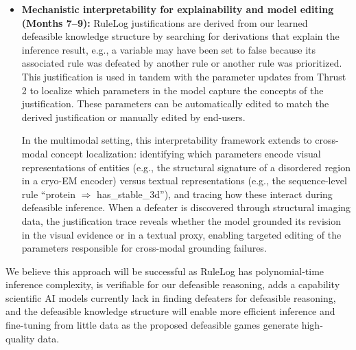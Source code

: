 \documentclass[11pt]{article}
\begin{document}
\begin{itemize}[leftmargin=1.5em]
To address the multimodal grounding deficit, the defeasibility games will incorporate multimodal inputs: the model plays against itself using mixed text, structure, and image evidence, forcing it to ground defeasible reasoning in perceptual data. The reward signal exploits a key property of our framework---because the polynomial-time proof checker verifies correctness at the level of the formal defeasible theory, it scores reasoning results identically regardless of input modality. This means the same verifier-backed reward function that drives text-only defeasibility games extends without modification to multimodal settings, providing an exact training signal for cross-modal defeasible generalization without additional annotation.

\item \textbf{Mechanistic interpretability for explainability and model editing (Months 7--9):} RuleLog justifications are derived from our learned defeasible knowledge structure by searching for derivations that explain the inference result, e.g., a variable may have been set to false because its associated rule was defeated by another rule or another rule was prioritized. This justification is used in tandem with the parameter updates from Thrust 2 to localize which parameters in the model capture the concepts of the justification. These parameters can be automatically edited to match the derived justification or manually edited by end-users.

In the multimodal setting, this interpretability framework extends to cross-modal concept localization: identifying which parameters encode visual representations of entities (e.g., the structural signature of a disordered region in a cryo-EM encoder) versus textual representations (e.g., the sequence-level rule ``protein $\Rightarrow$ has\_stable\_3d''), and tracing how these interact during defeasible inference. When a defeater is discovered through structural imaging data, the justification trace reveals whether the model grounded its revision in the visual evidence or in a textual proxy, enabling targeted editing of the parameters responsible for cross-modal grounding failures.
\end{itemize}

We believe this approach will be successful as RuleLog has polynomial-time inference complexity, is verifiable for our defeasible reasoning, adds a capability scientific AI models currently lack in finding defeaters for defeasible reasoning, and the defeasible knowledge structure will enable more efficient inference and fine-tuning from little data as the proposed defeasible games generate high-quality data.
\end{document}

